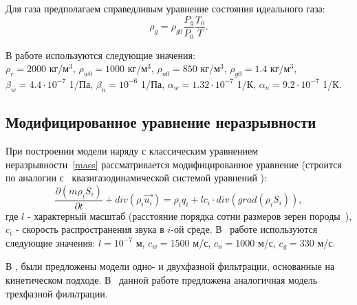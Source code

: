 Для газа предполагаем справедливым уравнение состояния идеального
газа:
$${\rho}_g = {\rho}_{g0}{\frac{P_g}{P_0}}{\frac{T_0}{T}}.$$

В работе используются следующие значения:\\
$\rho_r=2000$ кг/м$^3$, $\rho_{w0}=1000$ кг/м$^3$,
$\rho_{n0}=850$ кг/м$^3$, $\rho_{g0}=1.4$ кг/м$^3$,\\
$\beta_w=4.4\cdot10^{-7}$ 1/Па, $\beta_n=10^{-6}$ 1/Па,
$\alpha_w=1.32\cdot10^{-7}$ 1/К, $\alpha_n=9.2\cdot10^{-7}$ 1/К.

\subsection{Модифицированное уравнение неразрывности}
При построении модели наряду с классическим уравнением неразрывности~\ref{mass}
рассматривается модифицированное уравнение (строится по аналогии с~ квазигазодинамической системой
уравнений \cite{Chetverushkin-Mathmod}):
\begin{equation}
 \label{mass_mod}
  \frac{\partial (m \rho_i S_i)}{\partial t}+ div(\rho_i \overrightarrow{u_i}) = \rho_i q_i + l c_i \cdot div(grad(\rho_i S_i)),
\end{equation}
где $l$ - характерный масштаб (расстояние порядка сотни размеров зерен породы~\cite{Chetverushkin}),
$c_i$ - скорость распространения звука в $i$-ой среде.
В~ работе используются следующие значения: $l=10^{-7}$ м, $c_w=1500$ м/с, $c_n=1000$ м/с, $c_g=330$ м/с.

В \cite{Mathmod-2010},\cite{Mathmod-2011} были предложены модели одно- и двухфазной фильтрации, основанные на~
кинетическом подходе. В~ данной работе предложена аналогичная модель трехфазной фильтрации.

